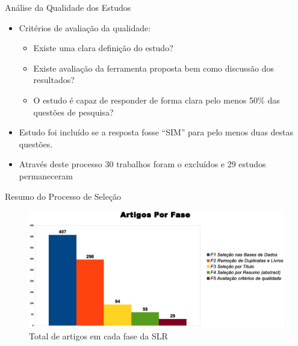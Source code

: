 \documentclass[t,14pt,mathserif]{beamer}
\begin{document}
\begin{frame}{Análise da Qualidade dos Estudos}
    \begin{itemize}
      \item Critérios de avaliação da qualidade:
           \begin{itemize}
                \item Existe uma clara definição do estudo?
                \item Existe avaliação da ferramenta proposta bem como discussão dos resultados?
                \item O estudo é capaz de responder de forma clara pelo menos
                  50\% das questões de pesquisa?
           \end{itemize}
       \item Estudo foi incluído se a resposta fosse ``SIM'' para pelo menos duas
         destas questões.
       \item Através deste processo 30 trabalhos foram o excluídos e 29 estudos
         permaneceram

    \end{itemize}
\end{frame}
\begin{frame}{Resumo do Processo de Seleção}

\begin{figure}[htb]
\centering
\includegraphics[width=\textwidth]{../img/graph_fases.eps}
\caption{Total de artigos em cada fase da SLR}%
\end{figure}
\end{frame}
\end{document}
